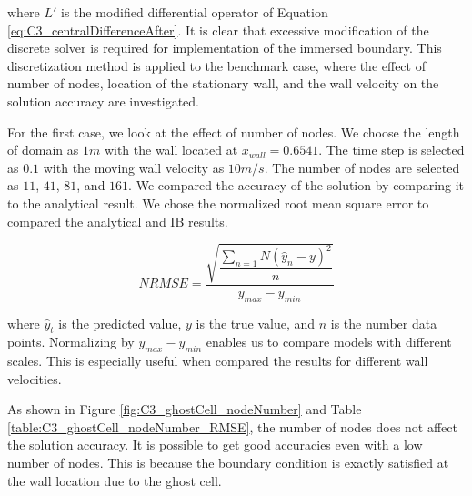 where $L'$ is the modified differential operator of Equation \eqref{eq:C3_centralDifferenceAfter}. It is clear that excessive modification of the discrete solver is required for implementation of the immersed boundary. This discretization method is applied to the benchmark case, where the effect of number of nodes, location of the stationary wall, and the wall velocity on the solution accuracy are investigated.

For the first case, we look at the effect of number of nodes. We choose the length of domain as $1m$ with the wall located at $x_{wall} = 0.6541$. The time step is selected as $0.1$ with the moving wall velocity as $10 m/s$. The number of nodes are selected as $11$, $41$, $81$, and $161$. We compared the accuracy of the solution by comparing it to the analytical result. We chose the normalized root mean square error to compared the analytical and IB results.

\begin{equation*}
	NRMSE = \dfrac{\sqrt{\dfrac{\sum_{n=1}{N} \left( \hat{y}_n - y \right)^2}{n}}}{y_{max} - y_{min}}
\end{equation*}

where $\hat{y}_t$ is the predicted value, $y$ is the true value, and $n$ is the number data points. Normalizing by $y_{max} - y_{min}$ enables us to compare models with different scales. This is especially useful when compared the results for different wall velocities.

As shown in Figure \ref{fig:C3_ghostCell_nodeNumber} and Table \ref{table:C3_ghostCell_nodeNumber_RMSE}, the number of nodes does not affect the solution accuracy. It is possible to get good accuracies even with a low number of nodes. This is because the boundary condition is exactly satisfied at the wall location due to the ghost cell.

